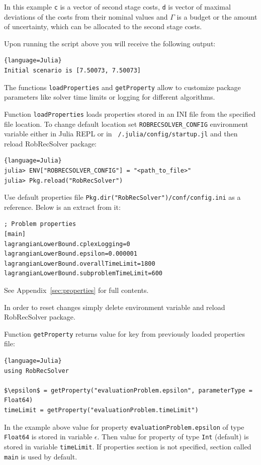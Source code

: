 In this example \texttt{c} is a vector of second stage costs, \texttt{d} is vector of maximal deviations of the costs from their nominal values and \texttt{$\Gamma$} is a budget or the amount of uncertainty, which can be allocated to the second stage costs.

Upon running the script above you will receive the following output:
\begin{lstlisting}{language=Julia}
Initial scenario is [7.50073, 7.50073]
\end{lstlisting}

The functions \texttt{loadProperties} and \texttt{getProperty} allow to customize package parameters like solver time limits or logging for different algorithms.

Function \texttt{loadProperties} loads properties stored in an INI file from the specified file location. To change default location set \texttt{ROBRECSOLVER\_CONFIG} environment variable either in Julia REPL or in \texttt{~/.julia/config/startup.jl} and then reload RobRecSolver package:
\begin{lstlisting}{language=Julia}
julia> ENV["ROBRECSOLVER_CONFIG"] = "<path_to_file>"
julia> Pkg.reload("RobRecSolver")
\end{lstlisting}
Use default properties file \texttt{Pkg.dir("RobRecSolver")/conf/config.ini} as a reference. Below is an extract from it:
\begin{lstlisting}
; Problem properties
[main]
lagrangianLowerBound.cplexLogging=0
lagrangianLowerBound.epsilon=0.000001
lagrangianLowerBound.overallTimeLimit=1800
lagrangianLowerBound.subproblemTimeLimit=600
\end{lstlisting}
See Appendix~\ref{sec:properties} for full contents.

In order to reset changes simply delete environment variable and reload RobRecSolver package.

Function \texttt{getProperty} returns value for key from previously loaded properties file:
\begin{lstlisting}[mathescape]{language=Julia}
using RobRecSolver

$\epsilon$ = getProperty("evaluationProblem.epsilon", parameterType = Float64)
timeLimit = getProperty("evaluationProblem.timeLimit")
\end{lstlisting}
In the example above value for property \texttt{evaluationProblem.epsilon} of type \texttt{Float64} is stored in variable \texttt{$\epsilon$}. Then value for property \texttt{} of type \texttt{Int} (default) is stored in variable \texttt{timeLimit}. If properties section is not specified, section called \texttt{main} is used by default.

